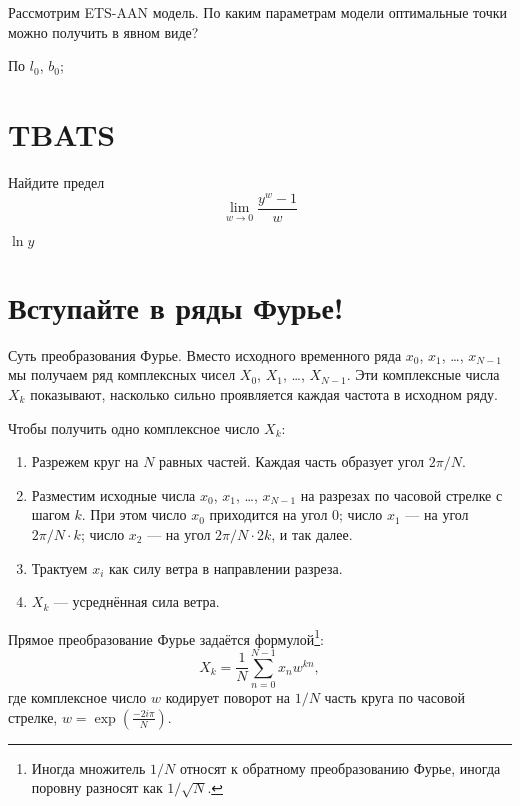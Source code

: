 \begin{problem}
  Рассмотрим ETS-AAN модель. По каким параметрам модели оптимальные точки можно получить в явном виде?


\begin{sol}
По $l_0$, $b_0$;
\end{sol}
\end{problem}





\chapter{TBATS}


\begin{problem}
  Найдите предел 
  \[
    \lim_{w \to 0} \frac{y^w - 1}{w} 
  \]
\begin{sol}
  $\ln y$
\end{sol}
\end{problem}








\chapter{Вступайте в ряды Фурье!}


Суть преобразования Фурье. Вместо исходного временного ряда $x_0$, $x_1$, \ldots, $x_{N-1}$ мы получаем ряд комплексных чисел $X_0$, $X_1$, \ldots, $X_{N-1}$. 
Эти комплексные числа $X_k$ показывают, насколько сильно проявляется каждая частота в исходном ряду.

Чтобы получить одно комплексное число $X_k$:

\begin{enumerate}
  \item Разрежем круг на $N$ равных частей. Каждая часть образует угол $2\pi/N$.
  \item Разместим исходные числа $x_0$, $x_1$, \ldots, $x_{N-1}$ на разрезах по часовой стрелке с шагом $k$. 
    При этом число $x_0$ приходится на угол $0$; число $x_1$ — на угол $2\pi/N \cdot k$; 
число $x_2$ — на угол $2\pi/N \cdot 2k$, и так далее. 
  \item Трактуем $x_i$ как силу ветра в направлении разреза.
  \item $X_k$ — усреднённая сила ветра.
\end{enumerate}


Прямое преобразование Фурье задаётся формулой\footnote{Иногда множитель $1/N$ относят к обратному преобразованию Фурье, иногда поровну разносят как $1/\sqrt{N}$.}:
\[
  X_k = \frac{1}{N} \sum_{n=0}^{N-1} x_n w^{kn}, 
\]
где комплексное число $w$ кодирует поворот на $1/N$ часть круга по часовой стрелке, $w = \exp\left(\frac{-2i\pi}{N} \right)$.



